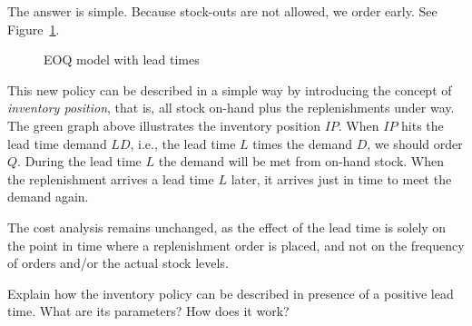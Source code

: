   \begin{solution}
    The answer is simple. Because stock-outs are not allowed, we order early. See Figure~\ref{fig:EOQleadtime}.

\begin{figure}[htbp]
\centering
{}
\caption{EOQ model with lead times}
\label{fig:EOQleadtime}
\end{figure}

    
This new policy can be described in a simple way by introducing the
concept of \emph{inventory position}, that is, all stock on-hand plus
the replenishments under way. The green graph above illustrates the
inventory position $IP$. When $IP$ hits the lead time demand $L D$,
i.e., the lead time $L$ times the demand $D$, we should order
$Q$. During the lead time $L$ the demand will be met from on-hand
stock. When the replenishment arrives a lead time $L$ later, it
arrives just in time to meet the demand again.

The cost analysis remains unchanged, as the effect of the lead time is solely on the point in time where a replenishment order is placed, and not on the frequency of orders and/or the actual stock levels. 
  \end{solution}

\begin{question}
Explain how the inventory policy can be described in presence of a positive lead time. What are its parameters? How does it work?
\end{question}

